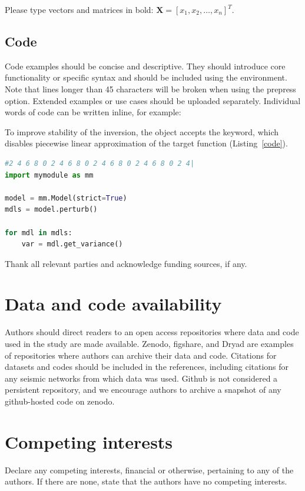 \documentclass[breakmath,review]{seismica}
\begin{document}
	Please type vectors and matrices in bold: $\mathbf{X} = \left[x_1,x_2,\ldots,x_n \right]^T$.

	\subsection{Code}

    Code examples should be concise and descriptive. They should introduce core functionality or specific syntax and should be included using the  environment. Note that lines longer than 45 characters will be broken when using the prepress option. Extended examples or use cases should be uploaded separately. Individual words of code can be written inline, for example:

        To improve stability of the inversion, the  object accepts the  keyword, which disables piecewise linear approximation of the target function (Listing~\ref{code}).

	\begin{lstlisting}[caption=Example use of \code{Model}, label=code, language=Python]
#2 4 6 8 0 2 4 6 8 0 2 4 6 8 0 2 4 6 8 0 2 4|
import mymodule as mm

model = mm.Model(strict=True)
mdls = model.perturb()

for mdl in mdls:
    var = mdl.get_variance()
	\end{lstlisting}
	
	\begin{acknowledgements}
		Thank all relevant parties and acknowledge funding sources, if any.
	\end{acknowledgements}
	
	\section*{Data and code availability}
	Authors should direct readers to an open access repositories where data and code used in the study are made available. Zenodo, figshare, and Dryad are examples of repositories where authors can archive their data and code. Citations for datasets and codes should be included in the references, including citations for any seismic networks from which data was used. Github is not considered a persistent repository, and we encourage authors to archive a snapshot of any github-hosted code on zenodo.
	
        \section*{Competing interests}
        Declare any competing interests, financial or otherwise, pertaining to any of the authors. If there are none, state that the authors have no competing interests.

	
	
\end{document}
